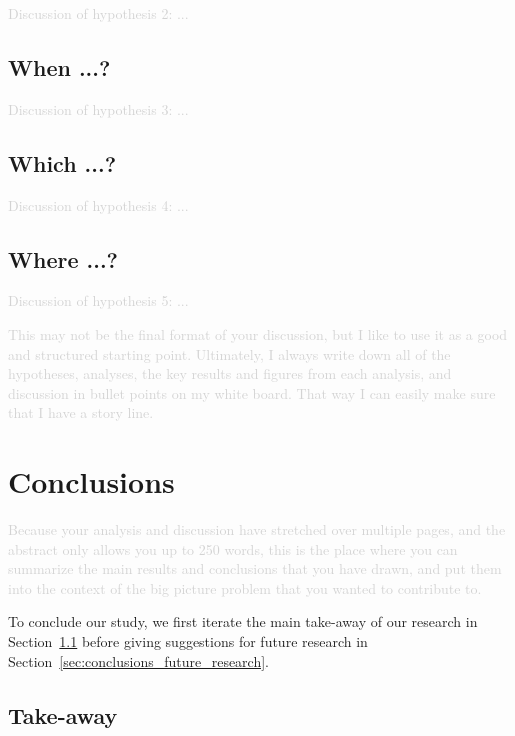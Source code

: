 \documentclass[fleqn,usenatbib]{mnras}
\newcommand{\comment}[1]{\textcolor{lightgray}{#1}}
\begin{document}
\comment{Discussion of hypothesis 2: ...}

\subsection{When ...?} \label{sec:discussion_hypothesis3}

\comment{Discussion of hypothesis 3: ...}

\subsection{Which ...?} \label{sec:discussion_hypothesis4}

\comment{Discussion of hypothesis 4: ...}

\subsection{Where ...?} \label{sec:discussion_hypothesis5}

\comment{Discussion of hypothesis 5: ...}


\comment{This may not be the final format of your discussion, but I like to use it as a good and structured starting point. Ultimately, I always write down all of the hypotheses, analyses, the key results and figures from each analysis, and discussion in bullet points on my white board. That way I can easily make sure that I have a story line.}

\clearpage
\section{Conclusions} \label{sec:conclusions}

\comment{Because your analysis and discussion have stretched over multiple pages, and the abstract only allows you up to 250 words, this is the place where you can summarize the main results and conclusions that you have drawn, and put them into the context of the big picture problem that you wanted to contribute to.}

To conclude our study, we first iterate the main take-away of our research in Section~\ref{sec:conclusions_takeaway} before giving suggestions for future research in Section~\ref{sec:conclusions_future_research}.

\subsection{Take-away} \label{sec:conclusions_takeaway}
\end{document}
